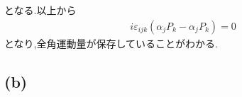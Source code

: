 \documentclass[uplatex,a4j,11pt,dvipdfmx]{jsarticle}
\begin{document}
となる.以上から
\begin{align}
  [H_{\rm Dirac},J_i+S_i]i\varepsilon_{ijk}(\alpha_jP_k-\alpha_jP_k)=0
\end{align}
となり,全角運動量が保存していることがわかる.
\subsection*{(b)}

\end{document}
